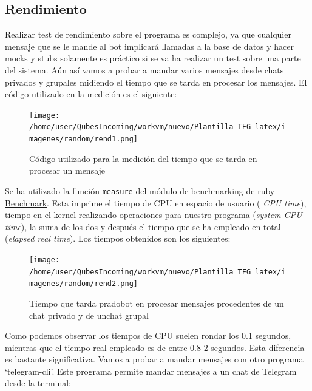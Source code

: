 \subsection{Rendimiento}
Realizar test de rendimiento sobre el programa es complejo, ya que cualquier mensaje que se le mande al bot implicará llamadas a la base de datos y hacer mocks y stubs solamente es práctico si se va ha realizar un test sobre una parte del sistema. Aún así vamos a probar a mandar varios mensajes desde chats privados y grupales midiendo el tiempo que se tarda en procesar los mensajes. El código utilizado en la medición es el siguiente:
\begin{figure}[H] %
\centering
\texttt{[image: /home/user/QubesIncoming/workvm/nuevo/Plantilla\_TFG\_latex/imagenes/random/rend1.png]}  %
\caption{Código utilizado para la medición del tiempo que se tarda en procesar un mensaje}\label{figura94}
\end{figure}



Se ha utilizado la función \texttt{measure} del módulo de benchmarking de ruby \href{https://ruby-doc.org/stdlib-2.0.0/libdoc/benchmark/rdoc/Benchmark.html}{Benchmark}. Esta imprime el tiempo de CPU en espacio de usuario (\textit{ CPU time}), tiempo en el kernel realizando operaciones para nuestro programa (\textit{system CPU time}), la suma de los dos  y después el tiempo que se ha empleado en total (\textit{elapsed real time}). Los tiempos obtenidos son los siguientes:

\begin{figure}[H] %
\centering
\texttt{[image: /home/user/QubesIncoming/workvm/nuevo/Plantilla\_TFG\_latex/imagenes/random/rend2.png]}  %
\caption{Tiempo que tarda pradobot en procesar mensajes procedentes de un chat privado y de unchat grupal}\label{figura94}
\end{figure}

Como podemos observar los tiempos de CPU suelen rondar los 0.1 segundos, mientras que el tiempo real empleado es de entre 0.8-2 segundos. Esta diferencia es bastante significativa. Vamos a probar a mandar mensajes con otro programa  \enquote*{telegram-cli}. Este programa permite mandar mensajes a un chat de Telegram desde la terminal:


